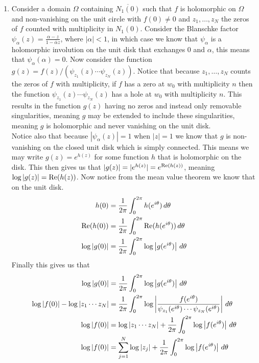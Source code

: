 \documentclass[12pt]{amsart}
\begin{document}
\begin{enumerate}
\item %
Consider a domain $\Omega$ containing $\overline{N_1(0)}$ such that $f$ is holomorphic on $\Omega$ and non-vanishing on the unit circle with $f(0)\neq 0$ and $z_1,\dots,z_N$ the zeros of $f$ counted with multiplicity in $N_1(0)$. Consider the Blanschke factor $\psi_\alpha(z)=\frac{\alpha-z}{1-\overline{\alpha}z}$, where $|\alpha|<1$, in which case we know that $\psi_\alpha$ is a holomorphic involution on the unit disk that exchanges $0$ and $\alpha$, this means that $\psi_\alpha(\alpha)=0$. Now consider the function $g(z)=f(z)/(\psi_{z_1}(z)\cdots\psi_{z_N}(z))$. Notice that because $z_1,\dots,z_N$ counts the zeros of $f$ with multiplicity, if $f$ has a zero at $w_0$ with multiplicity $n$ then the function $\psi_{z_1}(z)\cdots\psi_{z_N}(z)$ has a hole at $w_0$ with multiplicity $n$. This results in the function $g(z)$ having no zeros and instead only removable singularities, meaning $g$ may be extended to include these singularities, meaning $g$ is holomorphic and never vanishing on the unit disk. \\

Notice also that because $|\psi_\alpha(z)|=1$ when $|z|=1$ we know that $g$ is non-vanishing on the closed unit disk which is simply connected. This means we may write $g(z)=e^{h(z)}$ for some function $h$ that is holomorphic on the disk. This then gives us that $|g(z)|=|e^{h(z)}|=e^{\operatorname{\mathrm{Re}}(h(z))}$, meaning $\log\left| g(z) \right|=\operatorname{\mathrm{Re}}(h(z))$. Now notice from the mean value theorem we know that on the unit disk.\\

\begin{align*}
    h(0)&=\frac{1}{2\pi}\int_{0}^{2\pi}h(e^{i\theta})\,d\theta\\
    \operatorname{\mathrm{Re}}(h(0))&=\frac{1}{2\pi}\int_{0}^{2\pi}\operatorname{\mathrm{Re}}(h(e^{i\theta}))\,d\theta\\
    \log\left| g(0) \right|&=\frac{1}{2\pi}\int_{0}^{2\pi}\log\left| g(e^{i\theta}) \right|\,d\theta
\end{align*}
 Finally this gives us that
\begin{align*}
\log|g(0)|&=\frac{1}{2\pi}\int_{0}^{2\pi}\log\left| g(e^{i\theta}) \right|\,d\theta\\
\log\left| f(0) \right|-\log\left| z_1\cdots z_N \right|&= \frac{1}{2\pi}\int_{0}^{2\pi}\log\left| {\frac{f(e^{i\theta})}{\psi_{z_1}(e^{i\theta})\cdots\psi_{z_N}(e^{i\theta})}} \right|\,d\theta\\
\log\left| f(0) \right|&=\log\left| z_1\cdots z_N \right|+ \frac{1}{2\pi}\int_{0}^{2\pi}\log\left| f(e^{i\theta}) \right|\,d\theta\\
\log\left| f(0) \right|&=\sum_{j=1}^N\log\left| z_j \right|+ \frac{1}{2\pi}\int_{0}^{2\pi}\log\left| f(e^{i\theta}) \right|\,d\theta
\end{align*}
\end{enumerate}
\end{document}
